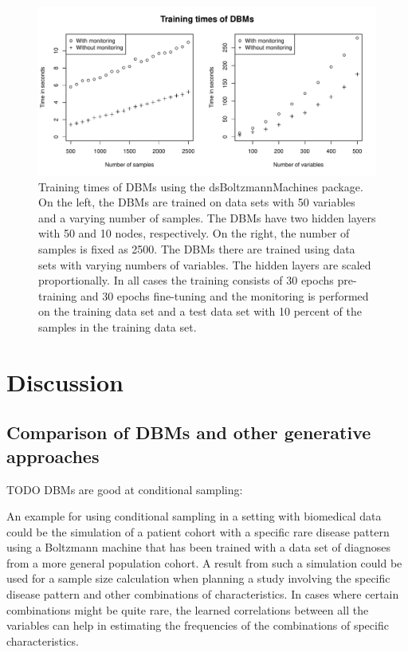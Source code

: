 \documentclass[12pt]{article}
\begin{document}
 
\begin{figure}[h]
   \centering
   \includegraphics[scale=.6]{images/trainingtimes.pdf}
   \caption{Training times of DBMs using the dsBoltzmannMachines package. On the left, the DBMs are trained on data sets with 50 variables and a varying number of samples. The DBMs have two hidden layers with 50 and 10 nodes, respectively. On the right, the number of samples is fixed as 2500. The DBMs there are trained using data sets with varying numbers of variables. The hidden layers are scaled proportionally. In all cases the training consists of 30 epochs pre-training and 30 epochs fine-tuning and the monitoring is performed on the training data set and a test data set with 10 percent of the samples in the training data set.}
   \label{fig:dbmtrainingtimes}
 \end{figure}
 
\clearpage
\FloatBarrier

\section{Discussion}

\subsection{Comparison of DBMs and other generative approaches}

TODO DBMs are good at conditional sampling:

An example for using conditional sampling in a setting with biomedical data could be the simulation of a patient cohort with a specific rare disease pattern using a Boltzmann machine that has been trained with a data set of diagnoses from a more general population cohort.
A result from such a simulation could be used for a sample size calculation when planning a study involving the specific disease pattern and other combinations of characteristics.
In cases where certain combinations might be quite rare, the learned correlations between all the variables can help in estimating the frequencies of the combinations of specific characteristics.
\end{document}

